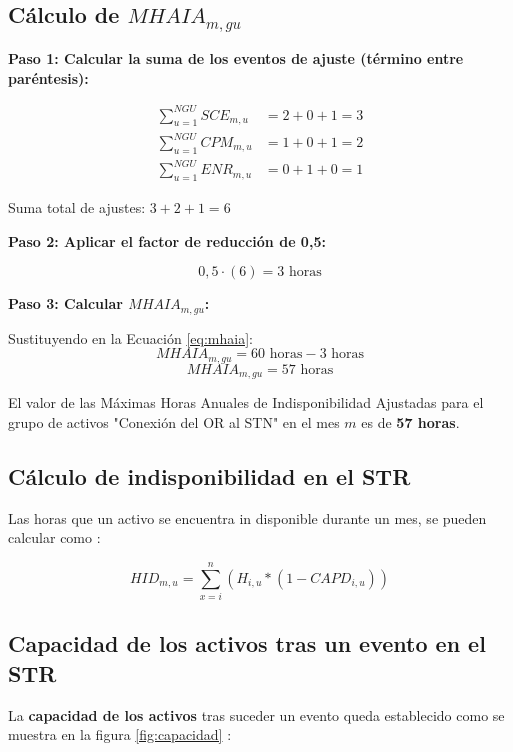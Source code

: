 \documentclass[a5paper]{book}%
\begin{document}
\subsection*{Cálculo de $MHAI A_{m, gu}$}

\textbf{Paso 1: Calcular la suma de los eventos de ajuste (término entre paréntesis):}

\begin{align*}
	\sum_{u=1}^{NGU} SCE_{m, u} &= 2 + 0 + 1 = 3 \\
	\sum_{u=1}^{NGU} CPM_{m, u} &= 1 + 0 + 1 = 2 \\
	\sum_{u=1}^{NGU} ENR_{m, u} &= 0 + 1 + 0 = 1
\end{align*}

Suma total de ajustes: $3 + 2 + 1 = 6$

\textbf{Paso 2: Aplicar el factor de reducción de 0,5:}

$$ 0,5 \cdot \left( 6 \right) = 3 \text{ horas} $$

\textbf{Paso 3: Calcular $MHAI A_{m, gu}$:}

Sustituyendo en la Ecuación \ref{eq:mhaia}:
$$ MHAI A_{m, gu} = 60 \text{ horas} - 3 \text{ horas} $$
$$ MHAI A_{m, gu} = 57 \text{ horas} $$

El valor de las Máximas Horas Anuales de Indisponibilidad Ajustadas para el grupo de activos "Conexión del OR al STN" en el mes $m$ es de \textbf{57 horas}.

\subsection{Cálculo de indisponibilidad en el STR}
Las horas que un activo  se encuentra  in disponible durante un mes, se pueden calcular como \cite{CREG0152018}:

\[ HID_{m,u} = \sum_{x=i}^{n}(H_{i,u}*(1-CAPD_{i,u}))  \]

\subsection{Capacidad de los activos tras un evento en el STR}

    La \textbf{capacidad de los activos} tras suceder un evento queda establecido  como se muestra en la figura \ref{fig:capacidad} \cite{CREG0152018}:
\end{document}
